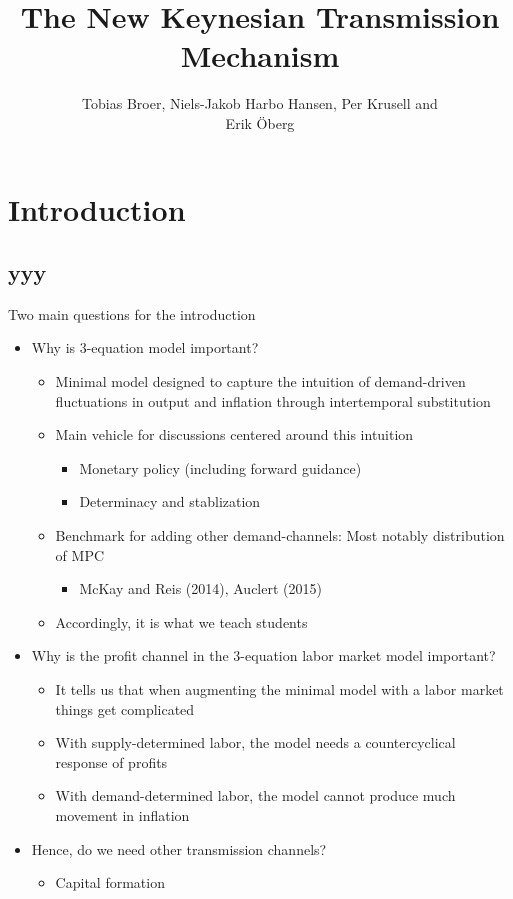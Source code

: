 \documentclass{beamer}
\title{The New Keynesian Transmission Mechanism}
\author{Tobias Broer, Niels-Jakob Harbo Hansen, Per Krusell and \\ Erik {\"O}berg}
\institute{Institute for International Economic Studies}
\newcommand{\bit}{\begin{itemize}}
\newcommand{\eit}{\end{itemize}}
\begin{document}
\begin{frame}
\maketitle
\end{frame}

\section{Introduction}
\subsection{yyy}

\begin{frame}{Two main questions for the introduction}

\bit
	\item Why is 3-equation model important?
	\bit
		\item Minimal model designed to capture the intuition of demand-driven fluctuations in output and inflation through intertemporal substitution
		\item Main vehicle for discussions centered around this intuition
			\bit
				\item Monetary policy (including forward guidance)
				\item Determinacy and stablization
			\eit
		\item Benchmark for adding other demand-channels: Most notably distribution of MPC
			\bit
				\item McKay and Reis (2014), Auclert (2015)
			\eit
		\item Accordingly, it is what we teach students
	\eit
	\item Why is the profit channel in the 3-equation labor market model important?
	\bit
		\item It tells us that when augmenting the minimal model with a labor market things get complicated
		\item With supply-determined labor, the model needs a countercyclical response of profits
		\item With demand-determined labor, the model cannot produce much movement in inflation
	\eit
	\item Hence, do we need other transmission channels?
		\bit
			\item Capital formation
		\eit
\eit


\end{frame}
\end{document}
